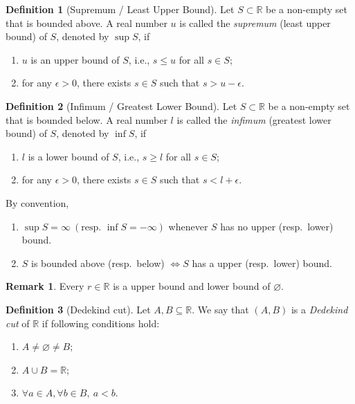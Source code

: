 \documentclass{article}
\theoremstyle{definition}
\newtheorem{definition}{Definition}
\newtheorem{remark}{Remark}
\begin{document}
\begin{definition}[Supremum / Least Upper Bound]
Let $S \subset \mathbb{R}$ be a non-empty set that is bounded above.  
A real number $u$ is called the \emph{supremum} (least upper bound) of $S$, denoted by $\sup S$, if
\begin{enumerate}
  \item $u$ is an upper bound of $S$, i.e., $s \le u$ for all $s \in S$;
  \item for any $\epsilon > 0$, there exists $s \in S$ such that $s > u - \epsilon$.
\end{enumerate}
\end{definition}

\begin{definition}[Infimum / Greatest Lower Bound]
Let $S \subset \mathbb{R}$ be a non-empty set that is bounded below.  
A real number $l$ is called the \emph{infimum} (greatest lower bound) of $S$, denoted by $\inf S$, if
\begin{enumerate}
  \item $l$ is a lower bound of $S$, i.e., $s \ge l$ for all $s \in S$;
  \item for any $\epsilon > 0$, there exists $s \in S$ such that $s < l + \epsilon$.
\end{enumerate}
\end{definition}

By convention,
\begin{enumerate}
    \item $\sup S = \infty\ (\text{resp.\ } \inf S = -\infty)$
whenever $S$ has no upper (resp.\ lower) bound.
    \item $S$ is bounded above (resp.\ below) $\iff S$ has a upper (resp.\ lower) bound.
\end{enumerate}

\begin{remark}
Every $r \in \mathbb{R}$ is a upper bound and lower bound of $\varnothing$.
\end{remark}

\begin{definition}[Dedekind cut]
Let $A, B \subseteq \mathbb{R}$. We say that $(A, B)$ is a \emph{Dedekind cut} of $\mathbb{R}$ if following conditions hold:
\begin{enumerate}
    \item $A \neq \varnothing \neq B$;
    \item $A \cup B = \mathbb{R}$;
    \item $\forall a \in A, \forall b \in B, \ a < b$.
\end{enumerate}
\end{definition}
\end{document}
